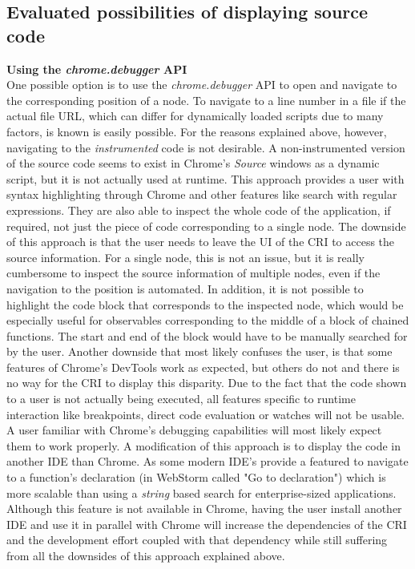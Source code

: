 \subsection{Evaluated possibilities of displaying source code}
\textbf{Using the \emph{chrome.debugger} API}\\
One possible option is to use the \emph{chrome.debugger} API to open and navigate to the corresponding position of a node. To navigate to a line number in a file if the actual file URL, which can differ for dynamically loaded scripts due to many factors, is known is easily possible. For the reasons explained above, however, navigating to the \emph{instrumented} code is not desirable. A non-instrumented version of the source code seems to exist in Chrome's \emph{Source} windows as a dynamic script, but it is not actually used at runtime. This approach provides a user with syntax highlighting through Chrome and other features like search with regular expressions. They are also able to inspect the whole code of the application, if required, not just the piece of code corresponding to a single node. The downside of this approach is that the user needs to leave the UI of the CRI to access the source information. For a single node, this is not an issue, but it is really cumbersome to inspect the source information of multiple nodes, even if the navigation to the position is automated. In addition, it is not possible to highlight the code block that corresponds to the inspected node, which would be especially useful for observables corresponding to the middle of a block of chained functions. The start and end of the block would have to be manually searched for by the user. Another downside that most likely confuses the user, is that some features of Chrome's DevTools work as expected, but others do not and there is no way for the CRI to display this disparity. Due to the fact that the code shown to a user is not actually being executed, all features specific to runtime interaction like breakpoints, direct code evaluation or watches will not be usable. A user familiar with Chrome's debugging capabilities will most likely expect them to work properly. A modification of this approach is to display the code in another IDE than Chrome. As some modern IDE's provide a featured to navigate to a function's declaration (in WebStorm called "Go to declaration") which is more scalable than using a \emph{string} based search for enterprise-sized applications. Although this feature is not available in Chrome, having the user install another IDE and use it in parallel with Chrome will increase the dependencies of the CRI and the development effort coupled with that dependency while still suffering from all the downsides of this approach explained above.\\

